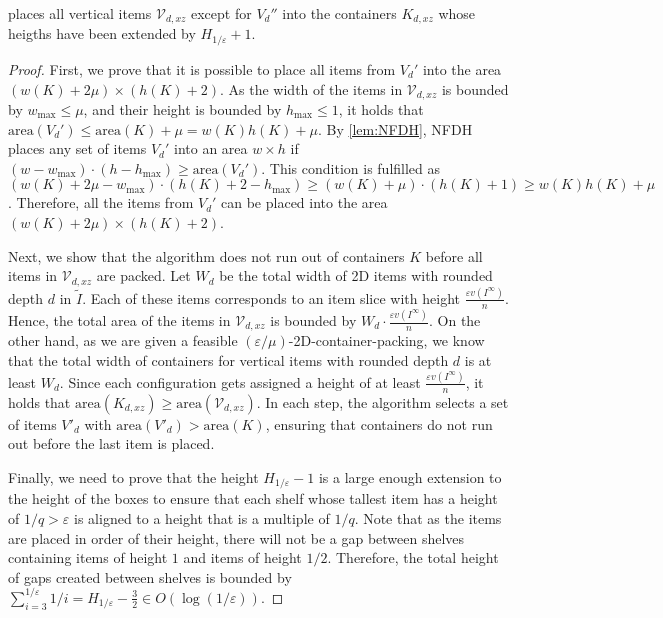 \documentclass[a4paper,UKenglish,cleveref, autoref, thm-restate]{lipics-v2021}
\newcommand{\eps}{\varepsilon}
\newcommand{\area}{\mathrm{area}}
\begin{document}
\begin{lemma}
     places all vertical items $\mathcal{V}_{d,xz}$ except for $V_d''$ into the containers $K_{d,xz}$ whose heigths have been extended by $H_{1/\eps}+1$.
\end{lemma}
\begin{proof}
First, we prove that it is possible to place all items from $V_d'$ into the area $(w(K) +2\mu) \times (h(K)+2)$. 
As the width of the items in $\mathcal{V}_{d,xz}$ is bounded by $w_{\max} \leq \mu$, and their height is bounded by $h_{\max}\leq 1$, it holds that $\area(V_d') \leq \area(K) +\mu = w(K)h(K)+\mu$. 
By \cref{lem:NFDH}, NFDH places any set of items $V_d'$ into an area $w \times h$ if 
$(w-w_{\max}) \cdot (h -h_{\max}) \geq \area(V_d')$.
This condition is fulfilled as $(w(K) +2\mu -w_{\max}) \cdot (h(K)+2 -h_{\max}) \geq (w(K) +\mu) \cdot (h(K)+1) \geq w(K)h(K)+\mu$.
Therefore, all the items from $V_d'$ can be placed into the area $(w(K) +2\mu) \times (h(K)+2)$.

Next, we show that the algorithm does not run out of containers $K$ before all items in $\mathcal{V}_{d,xz}$ are packed. 
Let $W_d$ be the total width of 2D items with rounded depth $d$ in $\tilde{I}$.
Each of these items corresponds to an item slice with height $\frac{\eps v(I^{\infty})}{n}$. 
Hence, the total area of the items in $\mathcal{V}_{d,xz}$ is bounded by $W_d \cdot \frac{\eps v(I^{\infty})}{n}$.
On the other hand, as we are given a feasible $(\eps/\mu)$-2D-container-packing, we know that the total width of containers for vertical items with rounded depth $d$ is at least $W_d$.
Since each configuration gets assigned a height of at least $\frac{\eps v(I^{\infty})}{n}$, it holds that $\area(K_{d,xz}) \geq \area(\mathcal{V}_{d,xz})$.
In each step, the algorithm selects a set of items $V'_d$ with $\area(V'_d) > \area(K)$, ensuring that containers do not run out before the last item is placed.

Finally, we need to prove that the height $H_{1/\eps}-1$ is a large enough extension to the height of the boxes to ensure that each shelf whose tallest item has a height of $1/q > \eps$ is aligned to a height that is a multiple of $1/q$. Note that as the items are placed in order of their height, there will not be a gap between shelves containing items of height $1$ and items of height $1/2$. Therefore, the total height of gaps created between shelves is bounded by $\sum_{i = 3}^{1/\eps}1/i = H_{1/\eps}-\frac{3}{2} \in O(\log(1/\eps))$.
\end{proof}
\end{document}
